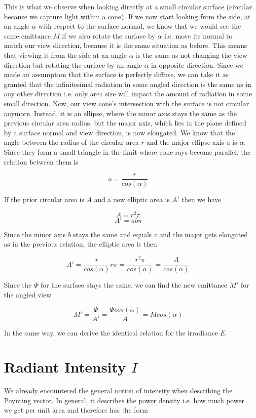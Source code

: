 \documentclass{article}
\begin{document}
This is what we observe when looking directly at a small circular surface (circular because we capture light within a cone). If we now start looking from the side, at an angle $\alpha$ with respect to the surface normal, we know that we would see the same emittance $M$ if we also rotate the surface by $\alpha$ i.e. move its normal to match our view direction, because it is the same situation as before. This means that viewing it from the side at an angle $\alpha$ is the same as not changing the view direction but rotating the surface by an angle $\alpha$ in opposite direction. Since we made an assumption that the surface is perfectly diffuse, we can take it as granted that the infinitesimal radiation in some angled direction is the same as in any other direction i.e. only area size will impact the amount of radiation in some small direction. Now, our view cone's intersection with the surface is not circular anymore. Instead, it is an ellipse, where the minor axis stays the same as the previous circular area radius, but the major axis, which lies in the plane defined by a surface normal and view direction, is now elongated. We know that the angle between the radius of the circular area $r$ and the major ellipse axis $a$ is $\alpha$. Since they form a small triangle in the limit where cone rays become parallel, the relation between them is

\[ a = \frac{r}{cos(\alpha)} \]

If the prior circular area is $A$ and a new elliptic area is $A'$ then we have

\[ A = r^2\pi \]
\[ A' = ab\pi \]

Since the minor axis $b$ stays the same and equals $r$ and the major gets elongated as in the previous relation, the elliptic area is then

\[ A' = \frac{r}{cos(\alpha)}r\pi = \frac{r^2\pi}{cos(\alpha)} = \frac{A}{cos(\alpha)} \]

Since the $\Phi$ for the surface stays the same, we can find the new emittance $M'$ for the angled view

\[ M' = \frac{\Phi}{A'} = \frac{\Phi cos(\alpha)}{A} = Mcos(\alpha) \]

In the same way, we can derive the identical relation for the irradiance $E$.

\section{Radiant Intensity $I$}

We already encountered the general notion of intensity when describing the Poynting vector. In general, it describes the power density i.e. how much power we get per unit area and therefore has the form
\end{document}

